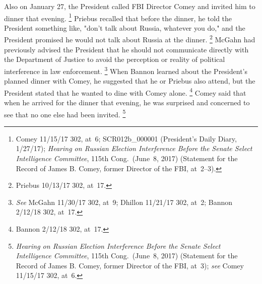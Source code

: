 Also on January 27, the President called FBI Director Comey and invited him to dinner that evening.%
\footnote{Comey 11/15/17 302, at~6;
SCR012b\_000001 (President's Daily Diary, 1/27/17);
\textit{Hearing on Russian Election Interference Before the Senate Select Intelligence Committee}, 115th Cong.\ (June~8, 2017) (Statement for the Record of James B. Comey, former Director of the FBI, at~2--3).}
Priebus recalled that before the dinner, he told the President something like, "don't talk about Russia, whatever you do," and the President promised he would not talk about Russia at the dinner.%
\footnote{Priebus 10/13/17 302, at~17.}
McGahn had previously advised the President that he should not communicate directly with the Department of Justice to avoid the perception or reality of political interference in law enforcement.%
\footnote{\textit{See} McGahn 11/30/17 302, at~9;
Dhillon 11/21/17 302, at~2;
Bannon 2/12/18 302, at~17.}
When Bannon learned about the President's planned dinner with Comey, he suggested that he or Priebus also attend, but the President stated that he wanted to dine with Comey alone.%
\footnote{Bannon 2/12/18 302, at~17.}
Comey said that when he arrived for the dinner that evening, he was surprised and concerned to see that no one else had been invited.%
\footnote{\textit{Hearing on Russian Election Interference Before the Senate Select Intelligence Committee}, 115th Cong.\ (June~8, 2017) (Statement for the Record of James B. Comey, former Director of the FBI, at~3);
\textit{see} Comey 11/15/17 302, at~6.}

